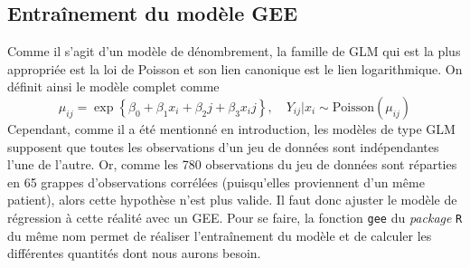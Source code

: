 \documentclass{article}
\begin{document}
	\subsection{Entraînement du modèle GEE}
	Comme il s'agit d'un modèle de dénombrement, la famille de GLM qui est la plus appropriée est la loi de Poisson et son lien canonique est le lien logarithmique. On définit ainsi le modèle complet comme
	\begin{equation}\label{model_GEE}
		\mu_{ij} = \exp\left\{\beta_0 + \beta_1 x_i + \beta_2 j+ \beta_3 x_i j\right\}, \quad Y_{ij}|x_i \sim \mathrm{Poisson}(\mu_{ij})
	\end{equation}
	Cependant, comme il a été mentionné en introduction, les modèles de type GLM supposent que toutes les observations d'un jeu de données sont indépendantes l'une de l'autre. Or, comme les 780 observations du jeu de données sont réparties en 65 grappes d'observations corrélées (puisqu'elles proviennent d'un même patient), alors cette hypothèse n'est plus valide. Il faut donc ajuster le modèle de régression à cette réalité avec un GEE. Pour se faire, la fonction \texttt{gee} du \textit{package} \texttt{R} du même nom permet de réaliser l'entraînement du modèle et de calculer les différentes quantités dont nous aurons besoin.\\
\end{document}
